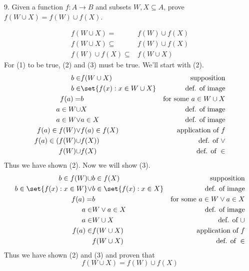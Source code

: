 \documentclass{hippoidC}
\begin{document}
\begin{prooflist}{9. Given a function $f: A \rightarrow B$ and subsets $W, X
    \subseteq A$, prove $f(W \cup X)=f(W) \cup f(X)$.}
\item \imagedef{}
\setcounter{equation}{0}
\begin{align}
    f(W \cup X)=&f(W) \cup f(X)\\
    f(W \cup X)\subseteq& f(W) \cup f(X) \\
    f(W) \cup f(X) \subseteq& f(W \cup X)
\end{align}
For (1) to be true, (2) and (3) must be true. We'll start with (2).
\begin{align}
    b\in& f(W\cup X) &\text{supposition}\\
    b\in& \set{f(x): x \in W\cup X} &\text{def. of image}\\
    f(a) =& b & \text{for some }a\in W\cup X\\
    a \in W \cup& X &\text{def. of image}\\
    a \in W \lor & a \in X &\text{def. of image}\\
    f(a) \in f(W) \lor& f(a) \in f(X)&\text{application of }f\\
    f(a) \in (f(W) \cup& f(X)) &\text{def. of }\lor\\
    f(W) \cup& f(X)&\text{def. of }\in
\end{align}
Thus we have shown (2). Now we will show (3).
\begin{align}
    b\in f(W)\cup& b\in f(X) &\text{supposition}\\
    b\in \set{f(x): x \in W} \lor& b\in \set{f(x): x \in X}&\text{def. of image}\\
    f(a) =& b & \text{for some }a\in W\lor a\in X\\
    a \in& W \lor a \in X &\text{def. of image}\\
    a \in& W \cup X &\text{def. of }\cup\\
    f(a) \in& f(W\cup X)&\text{application of }f\\
            &f(W\cup X)&\text{def. of }\in
\end{align}
Thus we have shown (2) and (3) and proven that
\[
    f(W \cup X)=f(W) \cup f(X)
\]
\end{prooflist}
\end{document}
